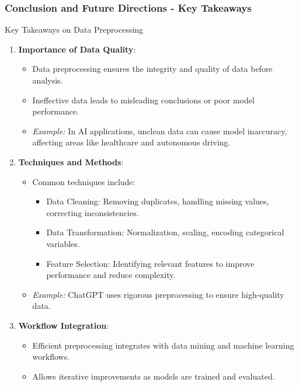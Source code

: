 \documentclass[aspectratio=169]{beamer}
\begin{document}
\begin{frame}[fragile]
    \frametitle{Conclusion and Future Directions - Key Takeaways}
    \begin{block}{Key Takeaways on Data Preprocessing}
        \begin{enumerate}
            \item \textbf{Importance of Data Quality}:
            \begin{itemize}
                \item Data preprocessing ensures the integrity and quality of data before analysis.
                \item Ineffective data leads to misleading conclusions or poor model performance.
                \item \textit{Example:} In AI applications, unclean data can cause model inaccuracy, affecting areas like healthcare and autonomous driving.
            \end{itemize}

            \item \textbf{Techniques and Methods}:
            \begin{itemize}
                \item Common techniques include:
                \begin{itemize}
                    \item Data Cleaning: Removing duplicates, handling missing values, correcting inconsistencies.
                    \item Data Transformation: Normalization, scaling, encoding categorical variables.
                    \item Feature Selection: Identifying relevant features to improve performance and reduce complexity.
                \end{itemize}
                \item \textit{Example:} ChatGPT uses rigorous preprocessing to ensure high-quality data.
            \end{itemize}
            
            \item \textbf{Workflow Integration}:
            \begin{itemize}
                \item Efficient preprocessing integrates with data mining and machine learning workflows.
                \item Allows iterative improvements as models are trained and evaluated.
            \end{itemize}
        \end{enumerate}
    \end{block}
\end{frame}
\end{document}
